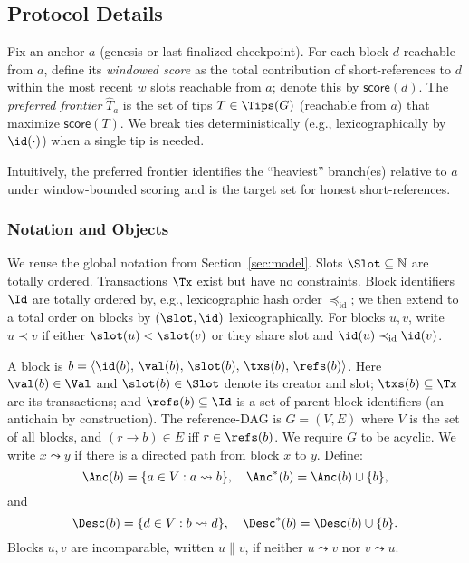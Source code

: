 \subsection{Protocol Details}
\begin{definition}
Fix an anchor $a$ (genesis or last finalized checkpoint). For each block $d$ reachable from $a$, define its \emph{windowed score}
as the total contribution of short-references to $d$ within the most recent $w$ slots reachable from $a$; denote this by $\mathsf{score}(d)$.
The \emph{preferred frontier} $\hat{T}_a$ is the set of tips $T\in \Tips(G)$ (reachable from $a$) that maximize $\mathsf{score}(T)$.
We break ties deterministically (e.g., lexicographically by $\id(\cdot)$) when a single tip is needed.
\end{definition}
\noindent Intuitively, the preferred frontier identifies the ``heaviest'' branch(es) relative to $a$ under window-bounded scoring and is the target set for honest short-references.


\subsubsection{Notation and Objects}
\label{subsec:ideal-notation}
We reuse the global notation from Section~\ref{sec:model}. %
Slots $\Slot\subseteq\mathbb{N}$ are totally ordered. Transactions $\Tx$ exist but have no constraints. Block identifiers $\Id$ are totally ordered by, e.g., lexicographic hash order $\preceq_{\mathrm{id}}$; we then extend to a total order on blocks by $(\slot,\id)$ lexicographically. For blocks $u,v$, write $u \prec v$ if either $\slot(u)<\slot(v)$ or they share slot and $\id(u)\prec_{\mathrm{id}}\id(v)$.

A block is $b=\langle \id(b),\,\val(b),\,\slot(b),\,\txs(b),\,\refs(b)\rangle$. Here $\val(b)\in\Val$ and $\slot(b)\in\Slot$ denote its creator and slot; $\txs(b)\subseteq\Tx$ are its transactions; and $\refs(b)\subseteq\Id$ is a set of parent block identifiers (an antichain by construction). The reference-DAG is $G=(V,E)$ where $V$ is the set of all blocks, and $(r\to b)\in E$ iff $r\in \refs(b)$. We require $G$ to be acyclic. We write $x\leadsto y$ if there is a directed path from block $x$ to $y$. Define:
\begin{equation*}
\Anc(b)=\{a\in V: a\leadsto b\},\quad \Anc^*(b)=\Anc(b)\cup\{b\},
\end{equation*}
and 
\begin{equation*}
\Desc(b)=\{d\in V: b\leadsto d\},\quad \Desc^*(b)=\Desc(b)\cup\{b\}.
\end{equation*}
Blocks $u,v$ are incomparable, written $u\parallel v$, if neither $u\leadsto v$ nor $v\leadsto u$.

